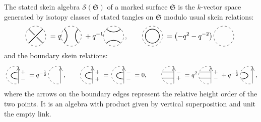 \documentclass[pdftex]{sigma}%
\numberwithin{equation}{section}
\newcommand{\Kaufhoriz}{\begin{tikzpicture}[scale = 0.5, baseline = -3pt]
\draw[dashed] (0,0) circle(1);
\draw[thick] (45:1) arc (-45:-135:1);
\draw[thick] (-45:1) arc (45:135:1);
\end{tikzpicture}}
\newcommand{\Kaufvert}{\begin{tikzpicture}[scale = 0.5, baseline = -3pt]
\draw[dashed] (0,0) circle(1);
\draw[thick] (45:1) arc (135:225:1);
\draw[thick] (135:1) arc (45:-45:1);
\end{tikzpicture}}
\newcommand{\Kauftresse}{\begin{tikzpicture}[scale = 0.5, baseline = -3pt]
\draw[dashed] (0,0) circle(1);
\draw[thick] (-45:1) -- (135:1) node[fill, color= white, pos = 0.5, circle, scale = 0.45]{};
\draw[thick] (45:1) -- (-135:1);
\end{tikzpicture}}
\newcommand{\Kaufcirc}{\begin{tikzpicture}[scale = 0.5, baseline = -3pt]
\draw[dashed] (0,0) circle(1);
\draw[thick] (0,0) circle(0.7);
\end{tikzpicture}}
\newcommand{\Kaufvide}{\begin{tikzpicture}[scale = 0.5, baseline = -3pt]
\draw[dashed] (0,0) circle(1);
\end{tikzpicture}}
\begin{document}
\begin{Definition}
The stated skein algebra $\mathscr{S}(\mathfrak{S})$ of a marked surface $\mathfrak{S}$ is the $k$-vector space generated by isotopy classes of stated tangles on $\mathfrak{S}$ modulo usual skein relations:
\[
\Kauftresse \ = q \Kaufvert\ + q^{-1} \Kaufhoriz\,, \qquad
\Kaufcirc \ = \big({-}q^2-q^{-2}\big)\, \Kaufvide\
\]
and the boundary skein relations:
\[
\begin{tikzpicture}[scale = 0.5, baseline = -3pt]
\draw[dashed] (70:1) arc(70:290:1);
\draw (-70:1) -- (70:1) node[pos = 0.85,sloped]{\small $>$};
\draw[thick] (70:1)++ (0,-0.6) node[right]{\small $+$} arc(90:270:0.8 and 0.4) node[right]{\small $-$};
\end{tikzpicture}
= q^{-\frac{1}{2}} \begin{tikzpicture}[scale = 0.5, baseline = -3pt]
\draw[dashed] (70:1) arc(70:290:1);
\draw (-70:1) -- (70:1) node[pos = 0.85,sloped]{\small $>$};
\end{tikzpicture}\!, \qquad
\begin{tikzpicture}[scale = 0.5, baseline = -3pt]
\draw[dashed] (70:1) arc(70:290:1);
\draw (-70:1) -- (70:1) node[pos = 0.85,sloped]{\small $>$};
\draw[thick] (70:1)++ (0,-0.6) node[right]{\small $+$} arc(90:270:0.8 and 0.4) node[right]{\small $+$};
\end{tikzpicture} = \begin{tikzpicture}[scale = 0.5, baseline = -3pt]
\draw[dashed] (70:1) arc(70:290:1);
\draw (-70:1) -- (70:1) node[pos = 0.85,sloped]{\small $>$};
\draw[thick] (70:1)++ (0,-0.6) node[right]{\small $-$} arc(90:270:0.8 and 0.4) node[right]{\small $-$};
\end{tikzpicture} = 0,
\qquad
\begin{tikzpicture}[scale = 0.5, baseline = -3pt]
\draw[dashed] (70:1) arc(70:290:1);
\draw (-70:1) -- (70:1) node[pos = 0.85,sloped]{\small $>$};
\draw[thick] (70:1)++ (0,-0.6) node[right]{\small $-$} -- ++(-1.3,0);
\draw[thick] (-70:1)++ (0,0.6) node[right]{\small $+$} -- ++(-1.3,0);
\end{tikzpicture}
=q^2 \begin{tikzpicture}[scale = 0.5, baseline = -3pt]
\draw[dashed] (70:1) arc(70:290:1);
\draw (-70:1) -- (70:1) node[pos = 0.85,sloped]{\small $>$};
\draw[thick] (70:1)++ (0,-0.6) node[right]{\small $+$} -- ++(-1.3,0);
\draw[thick] (-70:1)++ (0,0.6) node[right]{\small $-$} -- ++(-1.3,0);
\end{tikzpicture}
+q^{-\frac{1}{2}} \begin{tikzpicture}[scale = 0.5, baseline = -3pt]
\draw[dashed] (70:1) arc(70:290:1);
\draw (-70:1) -- (70:1) node[pos = 0.85,sloped]{\small $>$};
\draw[thick] (70:1)++ (-1.3,-0.6) arc(90:-90:0.8 and 0.4);
\end{tikzpicture}\!,
\]
where the arrows on the boundary edges represent the relative height order of the two points.
It is an algebra with product given by vertical superposition and unit the empty link.


\end{Definition}
\end{document}
